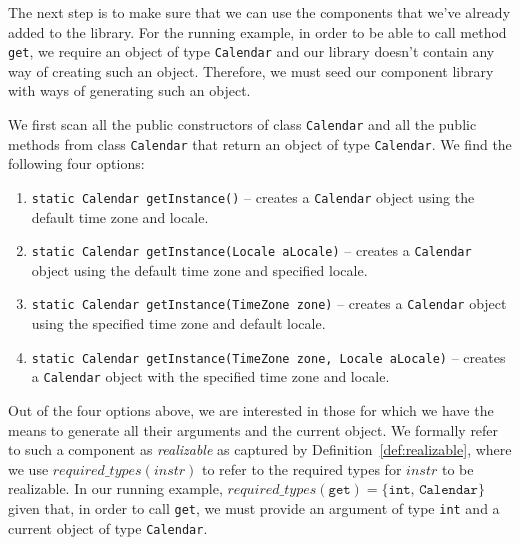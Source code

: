 \documentclass[sigconf,review,anonymous]{acmart}
\begin{document}
The next step is to make sure that we can use the components that we've already added to the library.
For the running example, in order to be able to call method \texttt{get}, we require an object of
type \texttt{Calendar} and our library doesn't contain any way of creating such an object.
Therefore, we must seed our component library with ways of generating such an object.

We first scan all the public constructors of class \texttt{Calendar}
and all the public methods from class \texttt{Calendar} that return an object of type \texttt{Calendar}. We find the following four options:

\begin{enumerate}
  \item \texttt{static Calendar	getInstance()} -- creates a \texttt{Calendar} object using the default time zone and locale.
  \item \texttt{static Calendar getInstance(Locale aLocale)} -- creates a \texttt{Calendar} object using the default time zone and specified locale.
  \item \texttt{static Calendar	getInstance(TimeZone zone)} -- creates a \texttt{Calendar} object using the specified time zone and default locale.
  \item \texttt{static Calendar	getInstance(TimeZone zone, Locale aLocale)} -- creates a \texttt{Calendar} object with the specified time zone and locale.
\end{enumerate}

%
Out of the four options above, we are interested in those for which we have the means to generate all their arguments and the current object. We formally refer to such a component as {\em realizable} as captured by Definition~\ref{def:realizable}, where we use 
$required\_types(instr)$ to refer to the required types
for $instr$ to be realizable. In our running example, $required\_types(\texttt{get}) = \{\texttt{int, Calendar}\}$
given that, in order to call \texttt{get}, we must provide an argument of type \texttt{int} and a current object of type \texttt{Calendar}.
\end{document}
